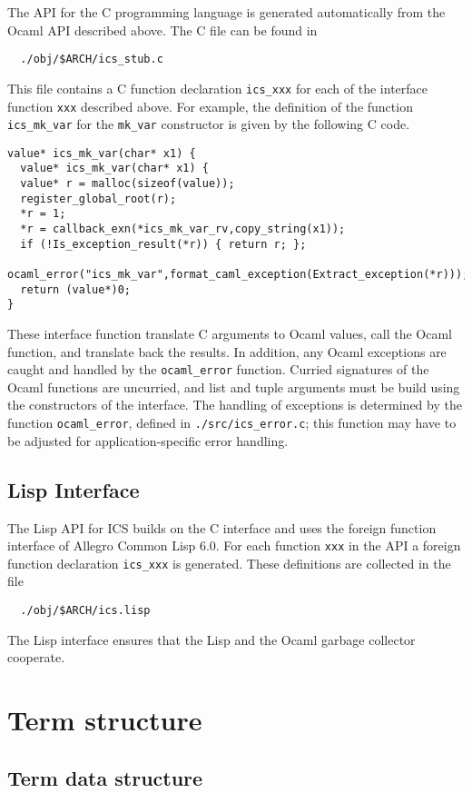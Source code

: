 \documentclass[12pt]{article}
\begin{document}
The API for the C programming language is generated automatically
from the Ocaml API described above. The C file can be found in
  \begin{verbatim}
  ./obj/$ARCH/ics_stub.c
  \end{verbatim}
This file contains a C function declaration \texttt{ics\_xxx} for each of the interface
function \texttt{xxx} described above.  For example, the definition of
the function \texttt{ics\_mk\_var} for the \texttt{mk\_var} constructor is
given by the following C code.
  \begin{verbatim}
value* ics_mk_var(char* x1) {
  value* ics_mk_var(char* x1) {
  value* r = malloc(sizeof(value));
  register_global_root(r);
  *r = 1;
  *r = callback_exn(*ics_mk_var_rv,copy_string(x1));
  if (!Is_exception_result(*r)) { return r; };
  ocaml_error("ics_mk_var",format_caml_exception(Extract_exception(*r)));
  return (value*)0;
}
 \end{verbatim}
These interface function translate C arguments to Ocaml values, call the
Ocaml function, and translate back the results. In addition, any Ocaml
exceptions are caught and handled by the \texttt{ocaml\_error} function.
Curried signatures of the Ocaml functions are uncurried, and list and
tuple arguments must be build using the constructors of the interface.
The handling of exceptions is determined by the function
\texttt{ocaml\_error}, defined in \texttt{./src/ics\_error.c}; this
function may have to be adjusted for application-specific error handling.

\subsection{Lisp Interface}

The Lisp API for ICS builds on the C interface and uses the foreign
function interface of Allegro Common Lisp 6.0.  For each function
\texttt{xxx} in the API a foreign function declaration \texttt{ics\_xxx}
is generated.  These definitions are collected in the file
 \begin{verbatim}
  ./obj/$ARCH/ics.lisp
  \end{verbatim}
The Lisp interface ensures that the Lisp and the Ocaml garbage collector
cooperate.

\section{Term structure}\label{sec:terms}

\subsection{Term data structure}\label{subsec:terms}
\end{document}
